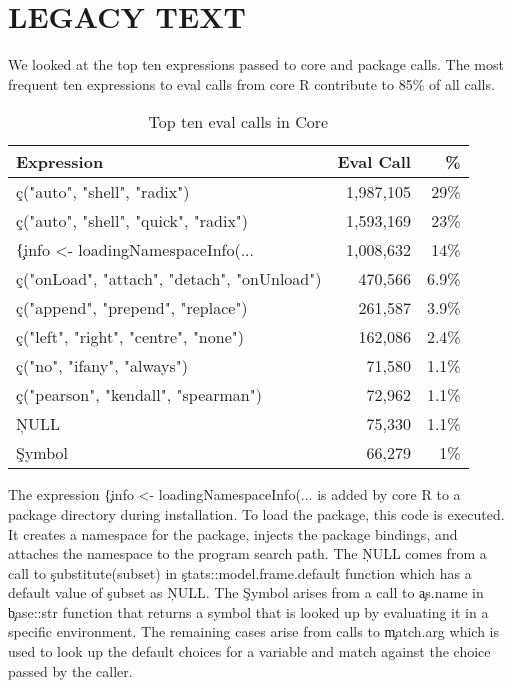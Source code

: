 \documentclass[acmsmall]{acmart}
\begin{document}
\section{LEGACY TEXT}

We looked at the top ten expressions passed to core and package \eval
calls. The most frequent ten expressions to eval calls from core R
contribute to 85\% of all \eval calls.

\begin{table}[!h] \centering
\begin{tabular}{@{}l|rr@{}} \hline
Expression & Eval Call &  \% \\\hline
\c{c("auto", "shell", "radix")} & 1,987,105 & 29\%\\
\c{c("auto", "shell", "quick", "radix")} & 1,593,169  & 23\%\\
\c{\{info <- loadingNamespaceInfo(...} & 1,008,632 &       14\%\\
\c{c("onLoad", "attach", "detach", "onUnload")}   & 470,566 &      6.9\%\\
\c{c("append", "prepend", "replace")} &              261,587&       3.9\% \\
\c{c("left", "right", "centre", "none")} & 162,086     & 2.4\%\\
\c{c("no", "ifany", "always")}   &                71,580 &       1.1\%\\
\c{c("pearson", "kendall", "spearman")}  & 72,962 &      1.1\%\\
\c{NULL}& 75,330  &      1.1\% \\
\c{Symbol}&                 66,279&       1\%\\\hline
\end{tabular}
\caption{Top ten eval calls in Core}\label{B}
\end{table}

The expression \c{\{info <- loadingNamespaceInfo(...} is added by core
R to a package directory during installation. To load the package,
this code is executed. It creates a namespace for the package, injects
the package bindings, and attaches the namespace to the program search
path. The \c{NULL} comes from a call to \c{substitute(subset)} in
\c{stats::model.frame.default} function which has a default value of
\c{subset} as \c{NULL}. The \c{Symbol} arises from a call to
\c{as.name} in \c{base::str} function that returns a symbol that is
looked up by evaluating it in a specific environment. The remaining
cases arise from calls to \c{match.arg} which is used to look up the
default choices for a variable and match against the choice passed by
the caller.
\end{document}
